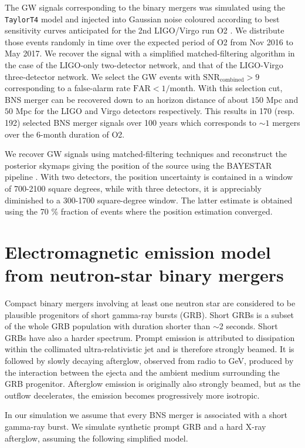\documentclass[11pt]{article}
\begin{document}
The GW signals corresponding to the binary mergers was simulated using the
\texttt{TaylorT4} model and injected into Gaussian noise coloured according to
best sensitivity curves anticipated for the 2nd LIGO/Virgo run O2
\citep{2016LRR....19....1A}. We distribute those events randomly in time over
the expected period of O2 from Nov 2016 to May 2017. We recover the signal with
a simplified matched-filtering algorithm \citep{2016PhRvD..93b4013S} in the case
of the LIGO-only two-detector network, and that of the LIGO-Virgo three-detector
network. We select the GW events with $\mathrm{SNR}_{\mathrm{combined}} > 9$
corresponding to a false-alarm rate $\mathrm{FAR} < 1/\mathrm{month}$.  With
this selection cut, BNS merger can be recovered down to an horizon distance of
about $150$ Mpc and $50$ Mpc for the LIGO and Virgo detectors respectively.
This results in 170 (resp. 192) selected BNS merger signals over 100
years which corresponds to $\sim 1$ mergers over the 6-month duration of O2.

We recover GW signals using matched-filtering techniques and reconstruct the
posterior skymaps giving the position of the source using the BAYESTAR pipeline
\citep{2016PhRvD..93b4013S}.  With two detectors, the position uncertainty is
contained in a window of 700-2100 square degrees, while with three detectors, it
is appreciably diminished to a 300-1700 square-degree window. The latter
estimate is obtained using the 70 \% fraction of events where the position
estimation converged.

\section*{Electromagnetic emission model from neutron-star binary mergers}

Compact binary mergers involving at least one neutron star are considered to be
plausible progenitors of short gamma-ray bursts (GRB). Short GRBs is a
subset of the whole GRB population with duration shorter than $\sim$2
seconds. Short GRBs have also a harder spectrum. Prompt emission is attributed
to dissipation within the collimated ultra-relativistic jet and is therefore
strongly beamed. It is followed by slowly decaying afterglow, observed from
radio to GeV, produced by the interaction between the ejecta and the ambient
medium surrounding the GRB progenitor. Afterglow emission is originally also
strongly beamed, but as the outflow decelerates, the emission becomes
progressively more isotropic.

In our simulation we assume that every BNS merger is associated with a short
gamma-ray burst. We simulate synthetic prompt GRB and a hard X-ray afterglow,
assuming the following simplified model. 
\end{document}
